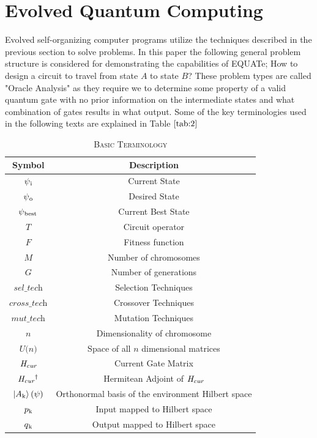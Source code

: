 \documentclass[conference]{IEEEtran}
\begin{document}
\section{Evolved Quantum Computing}

Evolved self-organizing computer programs \cite{self} utilize the techniques described in the previous section to solve problems. In this paper the following general problem structure is considered for demonstrating the capabilities of EQUATe; How to design a circuit to travel from state $\textit{A}$ to state $\textit{B}$? These problem types are called "Oracle Analysis" as they require we to determine some property of a valid quantum gate with no prior information on the intermediate states and what combination of gates results in what output. Some of the key terminologies used in the following texts are explained in Table $\ref{tab:2}$



\begin{table}[!t]
\caption{\textsc{Basic Terminology}}
\label{tab:2}
\centering
{
\begin{tabular}{| c | c |}
\hline
Symbol  & Description \\
\hline
$\psi\textsubscript{i}$ & Current State \\ 
$\psi\textsubscript{o}$ & Desired State \\
$\psi\textsubscript{best}$ & Current Best State \\
$\textit{T}$ & Circuit operator\\
$\textit{F}$ & Fitness function\\
$\textit{M}$ & Number of chromosomes\\
$\textit{G}$ & Number of generations\\
$\textit{sel\_tech}$ & Selection Techniques\\
$\textit{cross\_tech}$ & Crossover Techniques\\
$\textit{mut\_tech}$ & Mutation Techniques\\
$\textit{n}$ & Dimensionality of chromosome\\
$\textit{U(n)}$ & Space of all $\textit{n}$ dimensional matrices\\
$\textit{H\textsubscript{cur}}$ & Current Gate Matrix\\
$\textit{H\textsubscript{cur}\textsuperscript{$\dagger$}}$ & Hermitean Adjoint of $\textit{H\textsubscript{cur}}$\\
$\ket{A\textsubscript{k}}(\psi)$ & Orthonormal basis of the environment Hilbert space\\
$p\textsubscript{k}$ & Input mapped to Hilbert space\\
$q\textsubscript{k}$ & Output mapped to Hilbert space\\
\hline
\end{tabular}
}
\end{table}
\end{document}
